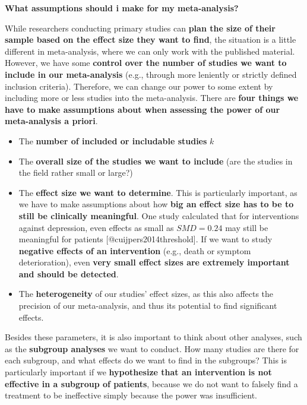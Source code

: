 \documentclass[]{book}
\providecommand{\tightlist}{%
  \setlength{\itemsep}{0pt}\setlength{\parskip}{0pt}}
\theoremstyle{definition}
\theoremstyle{definition}
\theoremstyle{definition}
\theoremstyle{remark}
\begin{document}
\begin{rmdinfo}
\textbf{What assumptions should i make for my meta-analysis?}

While researchers conducting primary studies can \textbf{plan the size
of their sample based on the effect size they want to find}, the
situation is a little different in meta-analysis, where we can only work
with the published material. However, we have some \textbf{control over
the number of studies we want to include in our meta-analysis} (e.g.,
through more leniently or strictly defined inclusion criteria).
Therefore, we can change our power to some extent by including more or
less studies into the meta-analysis. There are \textbf{four things we
have to make assumptions about when assessing the power of our
meta-analysis a priori}.

\begin{itemize}
\tightlist
\item
  The \textbf{number of included or includable studies} \(k\)
\item
  The \textbf{overall size of the studies we want to include} (are the
  studies in the field rather small or large?)
\item
  The \textbf{effect size we want to determine}. This is particularly
  important, as we have to make assumptions about how \textbf{big an
  effect size has to be to still be clinically meaningful}. One study
  calculated that for interventions against depression, even effects as
  small as \(SMD=0.24\) may still be meaningful for patients
  {[}@cuijpers2014threshold{]}. If we want to study \textbf{negative
  effects of an intervention} (e.g., death or symptom deterioration),
  even \textbf{very small effect sizes are extremely important and
  should be detected}.
\item
  The \textbf{heterogeneity} of our studies' effect sizes, as this also
  affects the precision of our meta-analysis, and thus its potential to
  find significant effects.
\end{itemize}

Besides these parameters, it is also important to think about other
analyses, such as the \textbf{subgroup analyses} we want to conduct. How
many studies are there for each subgroup, and what effects do we want to
find in the subgroups? This is particularly important if we
\textbf{hypothesize that an intervention is not effective in a subgroup
of patients}, because we do not want to falsely find a treatment to be
ineffective simply because the power was insufficient.
\end{rmdinfo}
\end{document}
